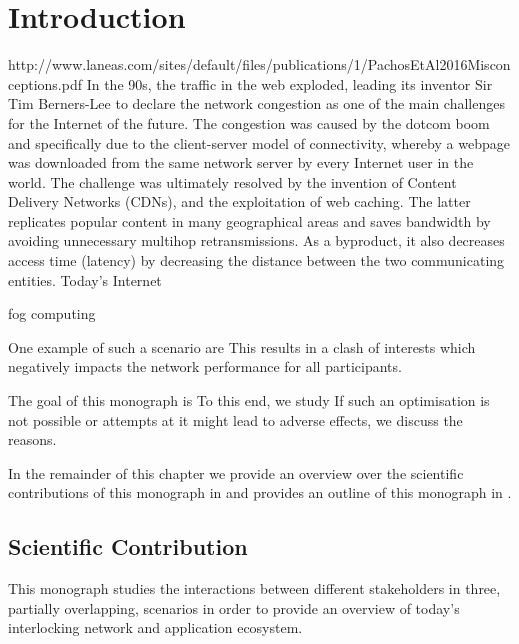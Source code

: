 \chapter{Introduction}\label{chap:introduction}
http://www.laneas.com/sites/default/files/publications/1/PachosEtAl2016Misconceptions.pdf
In
the 90s, the traffic in the web exploded, leading its inventor Sir Tim Berners-Lee to declare the
network congestion as one of the main challenges for the Internet of the future. The congestion
was caused by the
dotcom boom
and specifically due to the client-server model of connectivity,
whereby a webpage was downloaded from the same network server by every Internet user in the
world.  The  challenge  was  ultimately  resolved  by  the  invention  of  Content  Delivery  Networks
(CDNs),  and  the  exploitation  of  web  caching.  The  latter  replicates  popular  content  in  many
geographical areas and saves bandwidth by avoiding unnecessary multihop retransmissions. As
a byproduct, it also decreases access time (latency) by decreasing the distance between the two
communicating entities.
Today's Internet

fog computing

One example of such a scenario are
This results in a clash of interests which negatively impacts the network performance for all participants.

The goal of this monograph is
To this end, we study
If such an optimisation is not possible or attempts at it might lead to adverse effects, we discuss the reasons.

In the remainder of this chapter we provide an overview over the scientific contributions of this monograph in  and provides an outline of this monograph in .



\section{Scientific Contribution}\label{sec:introduction:scientific_contribution}
This monograph studies the interactions between different stakeholders in three, partially overlapping, scenarios in order to provide an overview of today's interlocking network and application ecosystem.

